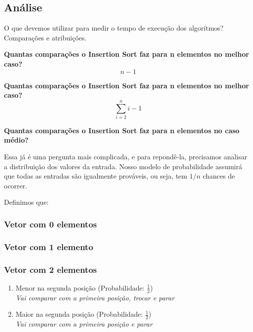 \documentclass{article}
\begin{document}
\subsection{Análise}
\textnormal{O que devemos utilizar para medir o tempo de execução dos algorítmos? Comparações e atribuições.}

\textbf{Quantas comparações o Insertion Sort faz para n elementos no melhor caso?}
\begin{equation}
n - 1
\end{equation}

\textbf{Quantas comparações o Insertion Sort faz para n elementos no melhor caso?} 
\begin{equation}
    \sum_{i=2}^{n} i-1
\end{equation}

\textbf{Quantas comparações o Insertion Sort faz para n elementos no caso médio?}

\textnormal{Essa já é uma pergunta mais complicada, e para repondê-la, precisamos analisar a distribuição dos valores da entrada. Nosso modelo de probabilidade assumirá que todas as entradas são igualmente prováveis, ou seja, tem $1/n$ chances de ocorrer.}

\textnormal{Definimos que:\\}
\indent  {}


\subsubsection{Vetor com 0 elementos}
\indent {}


\subsubsection{Vetor com 1 elemento}
\indent {}


\subsubsection{Vetor com 2 elementos}
\begin{enumerate}
\item {Menor na segunda posição (Probabilidade: $\frac{1}{2}$)\\}
    \em{Vai comparar com a primeira posição, trocar e parar\\}
\item {Maior na segunda posição (Probabilidade: $\frac{1}{2}$)\\}
    \em{Vai comparar com a primeira posição e parar\\}
\end{enumerate}
\end{document}

